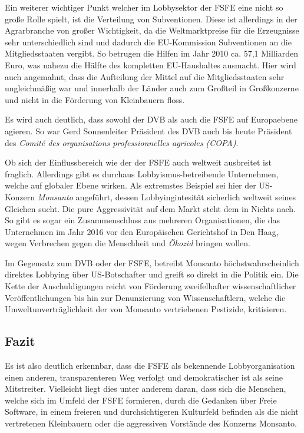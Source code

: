 Ein weiterer wichtiger Punkt welcher im Lobbysektor der FSFE eine nicht so 
große Rolle spielt, ist die Verteilung von Subventionen. Diese ist 
allerdings in der Agrarbranche von großer Wichtigkeit, da die Weltmarktpreise 
für die 
Erzeugnisse sehr unterschiedlich sind und dadurch \zB die EU-Kommission 
Subventionen an die Mitgliedsstaaten vergibt. So betrugen die Hilfen im Jahr 
2010 ca. 57,1 Milliarden Euro, was nahezu die Hälfte des kompletten 
EU-Haushaltes ausmacht. \cite{ZeitEuroAgrar} Hier wird auch angemahnt, dass die 
Aufteilung der Mittel auf die Mitgliedsstaaten sehr ungleichmäßig war
und innerhalb der Länder auch zum Großteil in Großkonzerne und nicht in die 
Förderung von Kleinbauern floss. \cite{ZeitEuroAgrar}

%
Es wird auch deutlich, dass sowohl der DVB als auch die FSFE auf Europaebene 
agieren. So war \zB Gerd Sonnenleiter Präsident des DVB auch bis heute 
Präsident des \emph{Comité des organisations professionnelles agricoles 
(COPA)}. \cite{WikiCopa}

Ob sich der Einflussbereich wie der der FSFE auch weltweit ausbreitet ist 
fraglich. 
Allerdings 
gibt es durchaus Lobbyismus-betreibende Unternehmen, welche auf globaler Ebene 
wirken. Als extremstes Beispiel sei hier der US-Konzern \emph{Monsanto} 
angeführt, dessen Lobbyingintesität sicherlich weltweit seines Gleichen sucht. 
Die pure Aggressivität auf dem Markt steht dem in Nichts nach. So gibt es sogar 
ein Zusammenschluss aus mehreren Organisationen, die das Unternehmen im Jahr 
2016 vor den Europäischen Gerichtshof in Den Haag, wegen Verbrechen gegen die 
Menschheit und \emph{Ökozid} bringen wollen. \cite{MonsantoTrail}

Im Gegensatz zum DVB oder der FSFE, betreibt Monsanto höchstwahrscheinlich 
direktes Lobbying über US-Botschafter \cite{WikiMonsanto} und greift so direkt 
in die Politik ein. Die Kette der Anschuldigungen reicht von 
Förderung zweifelhafter wissenschaftlicher Veröffentlichungen bis hin zur 
Denunzierung 
von Wissenschaftlern, welche die Umweltunverträglichkeit der von Monsanto 
vertriebenen Pestizide, kritisieren.

\subsection{Fazit}
Es ist also deutlich erkennbar, dass die FSFE als bekennende Lobbyorganisation 
einen anderen, transparenteren Weg verfolgt und demokratischer ist als seine 
Mitstreiter. Vielleicht liegt dies unter anderem daran, dass sich die 
Menschen, 
welche sich im Umfeld der FSFE formieren, durch die Gedanken über Freie 
Software, in einem freieren und durchsichtigeren Kulturfeld befinden als die 
nicht vertretenen Kleinbauern oder die aggressiven Vorstände des Konzerns 
Monsanto. 

